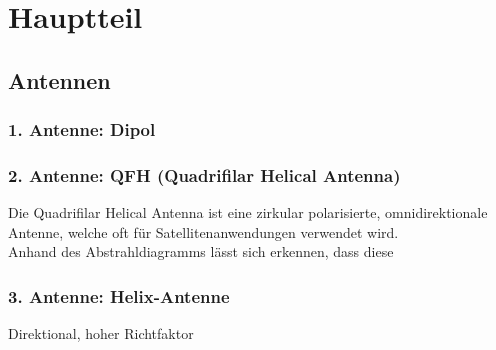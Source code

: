 \chapter{Hauptteil}
\section{Antennen}
\subsection{1. Antenne: Dipol}

\subsection{2. Antenne: QFH (Quadrifilar Helical Antenna)}
Die Quadrifilar Helical Antenna ist eine zirkular polarisierte, omnidirektionale Antenne, welche oft für Satellitenanwendungen verwendet wird.\\

Anhand des Abstrahldiagramms lässt sich erkennen, dass diese 

\subsection{3. Antenne: Helix-Antenne}
Direktional, hoher Richtfaktor

